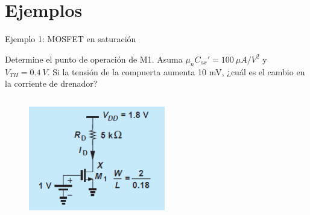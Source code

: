 \documentclass[t,aspectratio=169,10pt]{beamer}
\begin{document}
\section{Ejemplos}
\begin{frame}{Ejemplo 1: MOSFET en saturación}

Determine el punto de operación de M1. Asuma $\mu_n C_{ox}' = 100\ \mu{}A/V^2$ y $V_{TH} = 0.4\ V$. Si la tensión de la compuerta aumenta 10 mV, ¿cuál es el cambio en la corriente de drenador?

\begin{columns}

\begin{column}{0.5\textwidth}

\begin{figure}[H]
    \centering
    \includegraphics[width=0.7\textwidth]{figuras/mosfet_ejemplo_1.png}
\end{figure}

\end{column}

\begin{column}{0.5\textwidth}

\end{column}

\end{columns}

\end{frame}
\end{document}

